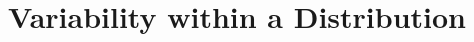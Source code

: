 \documentclass{article}
\begin{document}







\section{Variability within a Distribution\label{vwd}}
\end{document}

